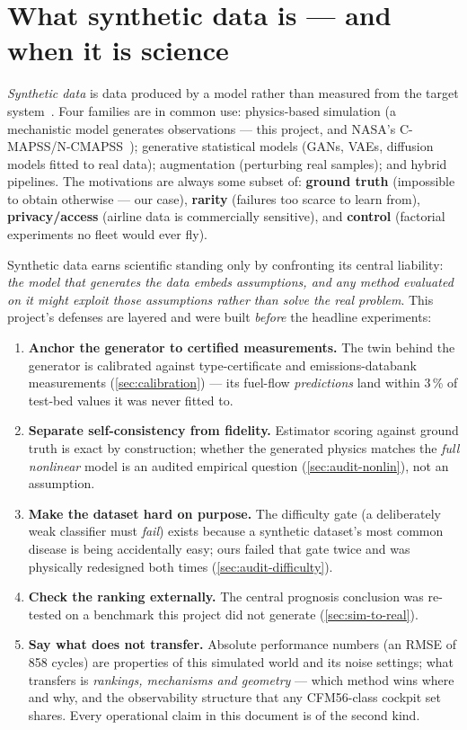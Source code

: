 \section{What synthetic data is --- and when it is science}
\label{sec:synthetic}

\emph{Synthetic data} is data produced by a model rather than measured from the target
system~\cite{Jordon2022,Nikolenko2021}. Four families are in common use: physics-based
simulation (a mechanistic model generates observations --- this project, and NASA's
C-MAPSS/N-CMAPSS~\cite{Saxena2008,AriasChao2021}); generative statistical models (GANs,
VAEs, diffusion models fitted to real data); augmentation (perturbing real samples); and
hybrid pipelines. The motivations are always some subset of: \textbf{ground truth}
(impossible to obtain otherwise --- our case), \textbf{rarity} (failures too scarce to
learn from), \textbf{privacy/access} (airline data is commercially sensitive), and
\textbf{control} (factorial experiments no fleet would ever fly).

Synthetic data earns scientific standing only by confronting its central liability:
\emph{the model that generates the data embeds assumptions, and any method evaluated on
it might exploit those assumptions rather than solve the real problem}. This project's
defenses are layered and were built \emph{before} the headline experiments:

\begin{enumerate}
  \item \textbf{Anchor the generator to certified measurements.} The twin behind the
    generator is calibrated against type-certificate and emissions-databank measurements
    (\cref{sec:calibration}) --- its fuel-flow \emph{predictions} land within
    3\,\% of test-bed values it was never fitted to.
  \item \textbf{Separate self-consistency from fidelity.} Estimator scoring against
    ground truth is exact by construction; whether the generated physics matches the
    \emph{full nonlinear} model is an audited empirical question
    (\cref{sec:audit-nonlin}), not an assumption.
  \item \textbf{Make the dataset hard on purpose.} The difficulty gate (a deliberately
    weak classifier must \emph{fail}) exists because a synthetic dataset's most common
    disease is being accidentally easy; ours failed that gate twice and was physically
    redesigned both times (\cref{sec:audit-difficulty}).
  \item \textbf{Check the ranking externally.} The central prognosis conclusion was
    re-tested on a benchmark this project did not generate (\cref{sec:sim-to-real}).
  \item \textbf{Say what does not transfer.} Absolute performance numbers (an RMSE of
    858 cycles) are properties of this simulated world and its noise settings;
    what transfers is \emph{rankings, mechanisms and geometry} --- which method wins
    where and why, and the observability structure that any CFM56-class cockpit set
    shares. Every operational claim in this document is of the second kind.
\end{enumerate}

